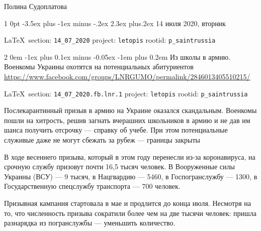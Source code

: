 \documentclass[a4paper,11pt]{extreport}
\makeatletter
\renewcommand\section{%
  \clearpage
  \@startsection{section}%
    {1}%
    {0pt}%
    {-3.5ex plus -1ex minus -.2ex}%
    {2.3ex plus.2ex}%
    {\centering\normalfont\Huge\bfseries}%
}
\renewcommand\subsection{%
  \clearpage
    \@startsection{subsection}%
    {2}%
    {0em}%
    {-1ex plus 0.1ex minus -0.05ex}%
    {-1em plus 0.2em}%
    {\scshape\bfseries\Large}%
}
\makeatother
\begin{document}
Полина Судоплатова
  
 
 

\section{14 июля 2020, вторник}
\label{sec:14_07_2020}


\vspace{0.5cm}
{\ifDEBUG\small\LaTeX~section: \verb|14_07_2020| project: \verb|letopis| rootid: \verb|p_saintrussia|\fi}
\vspace{0.5cm}

 
 
  
  
\subsection{Из школы в армию. Военкомы Украины охотятся на потенциальных абитуриентов }
\label{sec:14_07_2020.fb.lnr.1}
\url{https://www.facebook.com/groups/LNRGUMO/permalink/2846013405510215/}

\vspace{0.5cm}
 {\ifDEBUG\small\LaTeX~section: \verb|14_07_2020.fb.lnr.1| project: \verb|letopis| rootid: \verb|p_saintrussia| \fi}
\vspace{0.5cm}
  
  
Послекарантинный призыв в армию на Украине оказался скандальным. Военкомы пошли
на хитрость, решив загнать вчерашних школьников в армию и не дав им шанса
получить отсрочку --- справку об учебе. При этом потенциальные служивые даже не
могут сбежать за рубеж --- границы закрыты 

В ходе весеннего призыва, который в этом году перенесли из-за коронавируса, на
срочную службу призовут почти 16,5 тысяч человек. В Вооруженные силы Украины
(ВСУ) --- 9 тысяч, в Нацгвардию --- 5460, в Госпогранслужбу --- 1300, в
Государственную спецслужбу транспорта --- 700 человек. 

Призывная кампания стартовала в мае и продлится до конца июля. Несмотря на то,
что численность призыва сократили более чем на две тысячи человек: пришла
разнарядка из погранслужбы --- уменьшить количество. 
\end{document}
